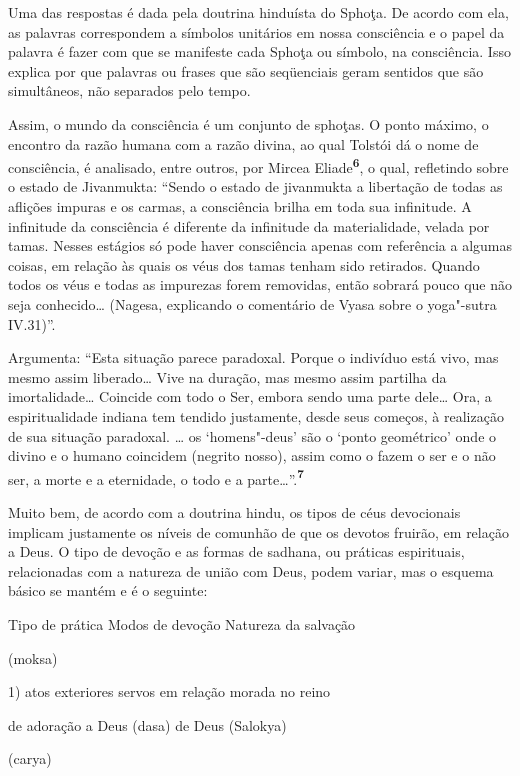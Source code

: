 Uma das respostas é dada pela doutrina hinduísta do Sphoţa. De acordo
com ela, as palavras correspondem a símbolos unitários em nossa
consciência e o papel da palavra é fazer com que se manifeste cada
Sphoţa ou símbolo, na consciência. Isso explica por que palavras ou
frases que são seqüenciais geram sentidos que são simultâneos, não
separados pelo tempo.

Assim, o mundo da consciência é um conjunto de sphoţas. O ponto máximo,
o encontro da razão humana com a razão divina, ao qual Tolstói dá o nome
de consciência, é analisado, entre outros, por Mircea
Eliade\textbf{\textsuperscript{6}}, o qual, refletindo sobre o estado de
Jivanmukta: ``Sendo o estado de jivanmukta a libertação de todas as
aflições impuras e os carmas, a consciência brilha em toda sua
infinitude. A infinitude da consciência é diferente da infinitude da
materialidade, velada por tamas. Nesses estágios só pode haver
consciência apenas com referência a algumas coisas, em relação às quais
os véus dos tamas tenham sido retirados. Quando todos os véus e todas as
impurezas forem removidas, então sobrará pouco que não seja
conhecido\ldots{} (Nagesa, explicando o comentário de Vyasa sobre o
yoga"-sutra IV.31)''.

Argumenta: ``Esta situação parece paradoxal. Porque o indivíduo está
vivo, mas mesmo assim liberado\ldots{} Vive na duração, mas mesmo assim
partilha da imortalidade\ldots{} Coincide com todo o Ser, embora sendo uma
parte dele\ldots{} Ora, a espiritualidade indiana tem tendido justamente,
desde seus começos, à realização de sua situação paradoxal. \ldots{} os
`homens"-deus' são o `ponto geométrico' onde o divino e o humano
coincidem (negrito nosso), assim como o fazem o ser e o não ser, a morte
e a eternidade, o todo e a parte\ldots{}''.\textbf{\textsuperscript{7}}

Muito bem, de acordo com a doutrina hindu, os tipos de céus devocionais
implicam justamente os níveis de comunhão de que os devotos fruirão, em
relação a Deus. O tipo de devoção e as formas de sadhana, ou práticas
espirituais, relacionadas com a natureza de união com Deus, podem
variar, mas o esquema básico se mantém e é o seguinte:

Tipo de prática Modos de devoção Natureza da salvação

(moksa)

1) atos exteriores servos em relação morada no reino

de adoração a Deus (dasa) de Deus (Salokya)

(carya)

